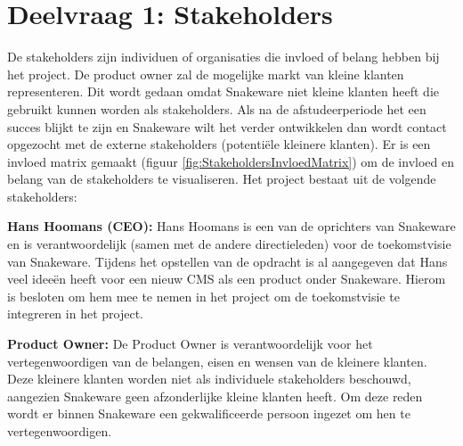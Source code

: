 \section{Deelvraag 1: Stakeholders}
De stakeholders zijn individuen of organisaties die invloed of belang hebben bij het project.
De product owner zal de mogelijke markt van kleine klanten representeren.
Dit wordt gedaan omdat Snakeware niet kleine klanten heeft die gebruikt kunnen worden als stakeholders.
Als na de afstudeerperiode het een succes blijkt te zijn en Snakeware wilt het verder ontwikkelen dan wordt contact opgezocht met de externe stakeholders (potentiële kleinere klanten). 
Er is een invloed matrix gemaakt (figuur \ref{fig:StakeholdersInvloedMatrix}) om de invloed en belang van de stakeholders te visualiseren. 
Het project bestaat uit de volgende stakeholders:

\whitespace
\textbf{Hans Hoomans (CEO):}
Hans Hoomans is een van de oprichters van Snakeware en is verantwoordelijk (samen met de andere directieleden) voor de toekomstvisie van Snakeware.
Tijdens het opstellen van de opdracht is al aangegeven dat Hans veel ideeën heeft voor een nieuw \gls{CMS} als een product onder Snakeware.
Hierom is besloten om hem mee te nemen in het project om de toekomstvisie te integreren in het project.

\whitespace
\textbf{Product Owner:}
De Product Owner is verantwoordelijk voor het vertegenwoordigen van de belangen, eisen en wensen van de kleinere klanten.
Deze kleinere klanten worden niet als individuele stakeholders beschouwd, aangezien Snakeware geen afzonderlijke kleine klanten heeft.
Om deze reden wordt er binnen Snakeware een gekwalificeerde persoon ingezet om hen te vertegenwoordigen.

